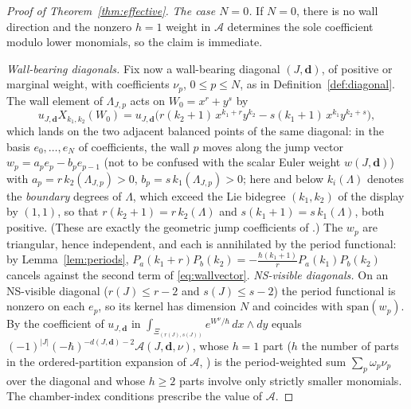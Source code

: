 \documentclass[11pt]{amsart}
\theoremstyle{definition}
\theoremstyle{remark}
\newcommand{\Ascr}{\mathcal{A}}
\begin{document}
\begin{proof}[Proof of Theorem~\ref{thm:effective}]
\emph{The case $N=0$.}
If $N=0$, there is no wall direction and the nonzero $h=1$ weight in
$\Ascr$ determines the sole coefficient modulo lower monomials, so the claim is
immediate.

\emph{Wall-bearing diagonals.}
Fix now a wall-bearing diagonal $(J,\mathbf d)$, of positive or
marginal weight, with coefficients $\nu_{p}$, $0\le p\le N$, as in
Definition~\ref{def:diagonal}. The wall element of
$\Lambda_{J,p}$ acts on $W_{0}=x^{r}+y^{s}$ by
\begin{equation}
\label{eq:wallvector}
u_{J,\mathbf d}X_{k_{1},k_{2}}(W_{0})
=u_{J,\mathbf d}\bigl(r(k_{2}{+}1)\,x^{k_{1}+r}y^{k_{2}}
-s(k_{1}{+}1)\,x^{k_{1}}y^{k_{2}+s}\bigr),
\end{equation}
which lands on the two adjacent balanced points of the same diagonal: in the basis
$e_{0},\dots,e_{N}$ of coefficients, the wall $p$ moves along the jump vector
$w_{p}=a_{p}e_{p}-b_{p}e_{p-1}$ (not to be confused with the scalar Euler
weight $w(J,\mathbf d)$) with $a_{p}=r\,k_{2}(\Lambda_{J,p})>0$,
$b_{p}=s\,k_{1}(\Lambda_{J,p})>0$; here and below $k_{i}(\Lambda)$ denotes the
\emph{boundary} degrees of $\Lambda$, which exceed the Lie bidegree
$(k_{1},k_{2})$ of the display by $(1,1)$, so that $r(k_{2}{+}1)=r\,k_{2}(\Lambda)$
and $s(k_{1}{+}1)=s\,k_{1}(\Lambda)$, both positive. (These are exactly the geometric jump
coefficients of \cite[(5.52)--(5.54)]{GKT}.) The $w_{p}$ are triangular, hence
independent, and each is annihilated by the period functional: by
Lemma~\ref{lem:periods}, $P_{a}(k_{1}{+}r)P_{b}(k_{2})
=-\tfrac{\hbar(k_{1}+1)}{r}P_{a}(k_{1})P_{b}(k_{2})$ cancels against the second
term of \eqref{eq:wallvector}. \emph{NS-visible diagonals.}
On an NS-visible diagonal ($r(J)\le r-2$ and
$s(J)\le s-2$) the period functional is nonzero on each $e_{p}$, so its kernel has
dimension $N$ and coincides with $\mathrm{span}(w_{p})$. By
\cite[Thm.~4.9]{GKT} the coefficient of $u_{J,\mathbf d}$ in
$\int_{\Xi_{(r(J),s(J))}}e^{W^{\nu}/\hbar}\,dx\wedge dy$ equals
$(-1)^{|J|}(-\hbar)^{-d(J,\mathbf d)-2}\Ascr(J,\mathbf d,\nu)$, whose $h=1$ part
($h$ the number of parts in the ordered-partition expansion of $\Ascr$,
\cite[Notation~3.42 and Thm.~4.9]{GKT}) is
the period-weighted sum $\sum_{p}\omega_{p}\nu_{p}$ over the diagonal and whose
$h\ge2$ parts involve only strictly smaller monomials. The chamber-index
conditions \cite[Def.~3.47]{GKT} prescribe the value of $\Ascr$.


\end{proof}
\end{document}
